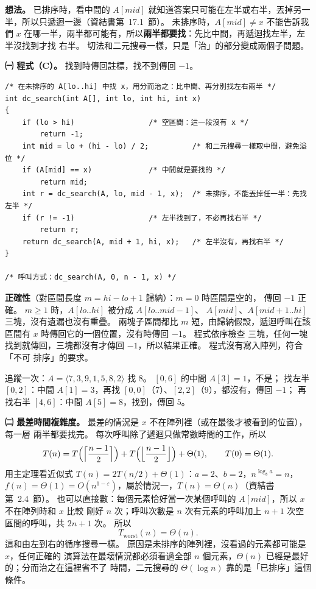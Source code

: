 \begin{pastsoln}
\textbf{想法。} 已排序時，看中間的 $A[\mathit{mid}]$ 就知道答案只可能在左半或右半，丟掉另一
半，所以只遞迴一邊（資結書第~17.1~節）。 未排序時，$A[\mathit{mid}] \ne x$ 不能告訴我們
$x$ 在哪一半，兩半都可能有，所以\textbf{兩半都要找}：先比中間，再遞迴找左半，左半沒找到才找
右半。 切法和二元搜尋一樣，只是「治」的部分變成兩個子問題。

\textbf{㈠ 程式（C）。} 找到時傳回註標，找不到傳回 $-1$。
\begin{verbatim}
/* 在未排序的 A[lo..hi] 中找 x，用分而治之：比中間、再分別找左右兩半 */
int dc_search(int A[], int lo, int hi, int x)
{
    if (lo > hi)                 /* 空區間：這一段沒有 x */
        return -1;
    int mid = lo + (hi - lo) / 2;          /* 和二元搜尋一樣取中間，避免溢位 */
    if (A[mid] == x)             /* 中間就是要找的 */
        return mid;
    int r = dc_search(A, lo, mid - 1, x);  /* 未排序，不能丟掉任一半：先找左半 */
    if (r != -1)                 /* 左半找到了，不必再找右半 */
        return r;
    return dc_search(A, mid + 1, hi, x);   /* 左半沒有，再找右半 */
}

/* 呼叫方式：dc_search(A, 0, n - 1, x) */
\end{verbatim}
\textbf{正確性}（對區間長度 $m = \mathit{hi} - \mathit{lo} + 1$ 歸納）：$m = 0$ 時區間是空的，
傳回 $-1$ 正確。 $m \ge 1$ 時，$A[\mathit{lo}..\mathit{hi}]$ 被分成 $A[\mathit{lo}..\mathit{mid}-1]$、
$A[\mathit{mid}]$、$A[\mathit{mid}+1..\mathit{hi}]$ 三塊，沒有遺漏也沒有重疊。 兩塊子區間都比
$m$ 短，由歸納假設，遞迴呼叫在該區間有 $x$ 時傳回它的一個位置，沒有時傳回 $-1$。 程式依序檢查
三塊，任何一塊找到就傳回，三塊都沒有才傳回 $-1$，所以結果正確。 程式沒有寫入陣列，符合「不可
排序」的要求。

追蹤一次：$A = \langle 7, 3, 9, 1, 5, 8, 2 \rangle$ 找 $8$。 $[0, 6]$ 的中間 $A[3] = 1$，不是；
找左半 $[0, 2]$：中間 $A[1] = 3$，再找 $[0, 0]$（$7$）、$[2, 2]$（$9$），都沒有，傳回 $-1$；
再找右半 $[4, 6]$：中間 $A[5] = 8$，找到，傳回 $5$。

\textbf{㈡ 最差時間複雜度。} 最差的情況是 $x$ 不在陣列裡（或在最後才被看到的位置），每一層
兩半都要找完。 每次呼叫除了遞迴只做常數時間的工作，所以
\[
T(n) = T\Bigl(\Bigl\lceil \frac{n-1}{2} \Bigr\rceil\Bigr) + T\Bigl(\Bigl\lfloor \frac{n-1}{2} \Bigr\rfloor\Bigr) + \Theta(1),
\qquad T(0) = \Theta(1).
\]
用主定理看近似式 $T(n) = 2T(n/2) + \Theta(1)$：$a = 2$、$b = 2$，$n^{\log_b a} = n$，
$f(n) = \Theta(1) = O(n^{1 - \varepsilon})$，屬於情況一，$T(n) = \Theta(n)$（資結書第~2.4~節）。
也可以直接數：每個元素恰好當一次某個呼叫的 $A[\mathit{mid}]$，所以 $x$ 不在陣列時和 $x$ 比較
剛好 $n$ 次；呼叫次數是 $n$ 次有元素的呼叫加上 $n + 1$ 次空區間的呼叫，共 $2n + 1$ 次。 所以
\[
T_{\text{worst}}(n) = \Theta(n).
\]
這和由左到右的循序搜尋一樣。 原因是未排序的陣列裡，沒看過的元素都可能是 $x$，任何正確的
演算法在最壞情況都必須看過全部 $n$ 個元素，$\Theta(n)$ 已經是最好的；分而治之在這裡省不了
時間，二元搜尋的 $\Theta(\log n)$ 靠的是「已排序」這個條件。
\end{pastsoln}

